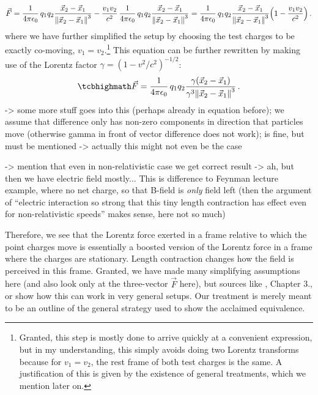 \documentclass[../class_mech_main.tex]{subfiles}
\DeclareMathOperator{\fpeps}{\frac{1}{4 \pi \epsilon_0}}
\begin{document}
\begin{ex}
    \begin{equation}
        \vec{F} = \fpeps q_1 q_2 \frac{\vec{x}_2 - \vec{x}_1}{\norm{\vec{x}_2 - \vec{x}_1}^3} - \frac{v_1 v_2}{c^2} \fpeps q_1 q_2 \frac{\vec{x}_2 - \vec{x}_1}{\norm{\vec{x}_2 - \vec{x}_1}^3} = \fpeps q_1 q_2 \frac{\vec{x}_2 - \vec{x}_1}{\norm{\vec{x}_2 - \vec{x}_1}^3} \qty(1 - \frac{v_1 v_2}{c^2})
        \notag\, .
    \end{equation}
    where we have further simplified the setup by choosing the test charges to be exactly co-moving, $v_1 = v_2$.\footnote{Granted, this step is mostly done to arrive quickly at a convenient expression, but in my understanding, this simply avoids doing two Lorentz transforms because for $v_1 = v_2$, the rest frame of both test charges is the same. A justification of this is given by the existence of general treatments, which we mention later on.} This equation can be further rewritten by making use of the Lorentz factor $\gamma = (1 - v^2 / c^2)^{-1/2}$:
    \begin{equation}
        \eqbox{
            \vec{F} = \fpeps q_1 q_2 \frac{\gamma(\vec{x}_2 - \vec{x}_1)}{\gamma^3 \norm{\vec{x}_2 - \vec{x}_1}^3}
        }
        \, .
    \end{equation}
    -> some more stuff goes into this (perhaps already in equation before); we assume that difference only has non-zero components in direction that particles move (otherwise gamma in front of vector difference does not work); is fine, but must be mentioned -> actually this might not even be the case

    -> mention that even in non-relativistic case we get correct result -> ah, but then we have electric field mostly... This is difference to Feynman lecture example, where no net charge, so that B-field is \emph{only} field left (then the argument of \enquote{electric interaction so strong that this tiny length contraction has effect even for non-relativistic speeds} makes sense, here not so much)

    Therefore, we see that the Lorentz force exerted in a frame relative to which the point charges move is essentially a boosted version of the Lorentz force in a frame where the charges are stationary. Length contraction changes how the field is perceived in this frame. Granted, we have made many simplifying assumptions here (and also look only at the three-vector $\vec{F}$ here), but sources like \cite{Rosser_1968}, Chapter 3., or \cite{Page_1912} show how this can work in very general setups. Our treatment is merely meant to be an outline of the general strategy used to show the acclaimed equivalence.


\end{ex}
\end{document}
